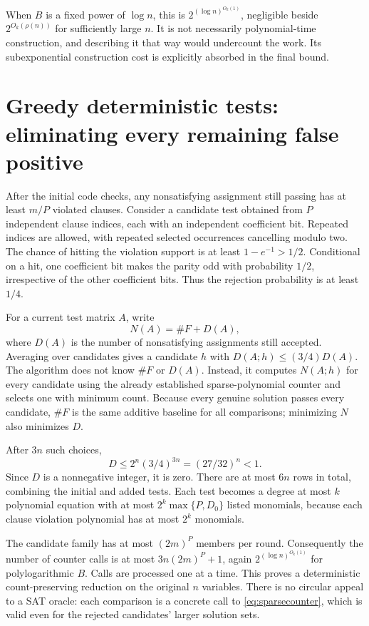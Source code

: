 \documentclass[11pt,a4paper]{article}
\numberwithin{equation}{section}
\theoremstyle{definition}
\theoremstyle{remark}
\begin{document}
When $B$ is a fixed power of $\log n$, this is
$2^{(\log n)^{O_k(1)}}$, negligible beside $2^{O_k(\rho(n))}$ for sufficiently
large $n$. It is not necessarily polynomial-time construction, and describing
it that way would undercount the work. Its subexponential construction cost
is explicitly absorbed in the final bound.

\section{Greedy deterministic tests: eliminating every remaining false positive}
\label{sec:greedy}
After the initial code checks, any nonsatisfying assignment still passing has
at least $m/P$ violated clauses. Consider a candidate test obtained from $P$
independent clause indices, each with an independent coefficient bit. Repeated
indices are allowed, with repeated selected occurrences cancelling modulo two.
The chance of hitting the violation support is at least $1-e^{-1}>1/2$.
Conditional on a hit, one coefficient bit makes the parity odd with probability
$1/2$, irrespective of the other coefficient bits. Thus the rejection
probability is at least $1/4$.

For a current test matrix $A$, write
\[
 N(A)=\#F+D(A),
\]
where $D(A)$ is the number of nonsatisfying assignments still accepted.
Averaging over candidates gives a candidate $h$ with
$D(A;h)\le(3/4)D(A)$. The algorithm does not know $\#F$ or $D(A)$.
Instead, it computes $N(A;h)$ for every candidate using the already established
sparse-polynomial counter and selects one with minimum count.
Because every genuine solution passes every candidate, $\#F$ is the same
additive baseline for all comparisons; minimizing $N$ also minimizes $D$.

After $3n$ such choices,
\[
 D\le2^n(3/4)^{3n}=(27/32)^n<1.
\]
Since $D$ is a nonnegative integer, it is zero. There are at most $6n$ rows
in total, combining the initial and added tests. Each test becomes a degree
at most $k$ polynomial equation with at most
$2^k\max\{P,D_0\}$ listed monomials, because each clause violation polynomial
has at most $2^k$ monomials.

The candidate family has at most $(2m)^P$ members per round. Consequently the
number of counter calls is at most $3n(2m)^P+1$, again
$2^{(\log n)^{O_k(1)}}$ for polylogarithmic $B$. Calls are processed one at a
time. This proves a deterministic count-preserving reduction on the original
$n$ variables. There is no circular appeal to a SAT oracle: each comparison
is a concrete call to \eqref{eq:sparsecounter}, which is valid even for the
rejected candidates' larger solution sets.
\end{document}
